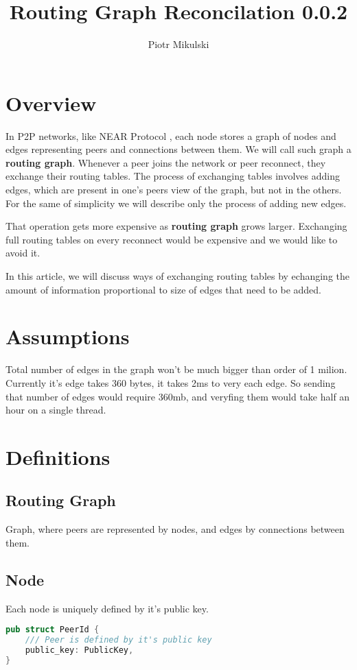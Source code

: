 \documentclass[11pt]{article}
\title{\textbf{Routing Graph Reconcilation 0.0.2}}
\author{Piotr Mikulski}
\date{}
\begin{document}
\maketitle
\thispagestyle{empty}

\section{Overview}
In P2P networks, like NEAR Protocol \cite{near}, each node stores a graph of nodes and edges representing peers and connections between them.
We will call such graph a \textbf{routing graph}.
Whenever a peer joins the network or peer reconnect, they exchange their routing tables.
The process of exchanging tables involves adding edges, which are present in one's peers view of the graph, but not in the others.
For the same of simplicity we will describe only the process of adding new edges.

That operation gets more expensive as \textbf{routing graph} grows larger.
Exchanging full routing tables on every reconnect would be expensive and we would like to avoid it.

In this article, we will discuss ways of exchanging routing tables by echanging the amount of information proportional to size of edges that need to be added.

\section{Assumptions}
Total number of edges in the graph won't be much bigger than order of 1 milion. Currently it's edge takes 360 bytes, it takes 2ms to very each edge.
So sending that number of edges would require 360mb, and veryfing them would take half an hour on a single thread.

\section{Definitions}
\subsection{Routing Graph}
Graph, where peers are represented by nodes, and edges by connections between them.
\subsection{Node}
Each node is uniquely defined by it's public key.
\begin{lstlisting}[language=Rust]
pub struct PeerId {
    /// Peer is defined by it's public key
    public_key: PublicKey,
}
\end{lstlisting}
\end{document}
